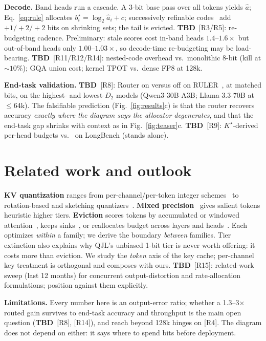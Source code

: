 \documentclass{article} %
\newcommand{\tbd}[1]{{\color{tbdcol}\textbf{TBD}~#1}}
\theoremstyle{definition}
\begin{document}
\textbf{Decode.} Band heads run a cascade. A 3-bit base pass over all tokens yields $\hat a$; Eq.~\ref{eq:rule} allocates $b_i^\star=\log_2\hat a_i+c$; successively refinable codes~\citep{equitz1991successive} add $+1/+2/+2$ bits on shrinking sets; the tail is evicted. \tbd{[R3/R5]: re-budgeting cadence. Preliminary: stale scores cost in-band heads $1.4$--$1.6\times$ but out-of-band heads only $1.00$--$1.03\times$, so decode-time re-budgeting may be load-bearing.} \tbd{[R11/R12/R14]: nested-code overhead vs.\ monolithic 8-bit (kill at ${\sim}10\%$); GQA union cost; kernel TPOT vs.\ dense FP8 at 128k.}

\textbf{End-task validation.} \tbd{[R8]:} Router on versus off on RULER~\citep{hsieh2024ruler}, at matched bits, on the highest- and lowest-$D_2$ models (Qwen3-30B-A3B; Llama-3.3-70B at $\le$64k). The falsifiable prediction (Fig.~\ref{fig:results}c) is that the router recovers accuracy \emph{exactly where the diagram says the allocator degenerates}, and that the end-task gap shrinks with context as in Fig.~\ref{fig:teaser}c. \tbd{[R9]: $K^\star$-derived per-head budgets vs.\ \citet{feng2024adakv,cai2024pyramidkv} on LongBench (stands alone).}

\section{Related work and outlook}

\textbf{KV quantization} ranges from per-channel/per-token integer schemes~\citep{liu2024kivi,hooper2024kvquant} to rotation-based and sketching quantizers~\citep{zandieh2025turboquant,zandieh2024qjl}. \textbf{Mixed precision}~\citep{yang2024mikv,he2024zipcache} gives salient tokens heuristic higher tiers. \textbf{Eviction} scores tokens by accumulated or windowed attention~\citep{zhang2023h2o,li2024snapkv,liu2023scissorhands}, keeps sinks~\citep{xiao2024streamingllm}, or reallocates budget across layers and heads~\citep{cai2024pyramidkv,feng2024adakv}. Each optimizes \emph{within} a family; we derive the boundary \emph{between} families. Tier extinction also explains why QJL's unbiased 1-bit tier is never worth offering: it costs more than eviction. We study the \emph{token} axis of the key cache; per-channel key treatment is orthogonal and composes with ours. \tbd{[R15]: related-work sweep (last 12 months) for concurrent output-distortion and rate-allocation formulations; position against them explicitly.}

\textbf{Limitations.} Every number here is an output-error ratio; whether a 1.3--3$\times$ routed gain survives to end-task accuracy and throughput is the main open question (\tbd{[R8], [R14]}), and reach beyond 128k hinges on [R4]. The diagram does not depend on either: it says where to spend bits before deployment.




\appendix

\end{document}

